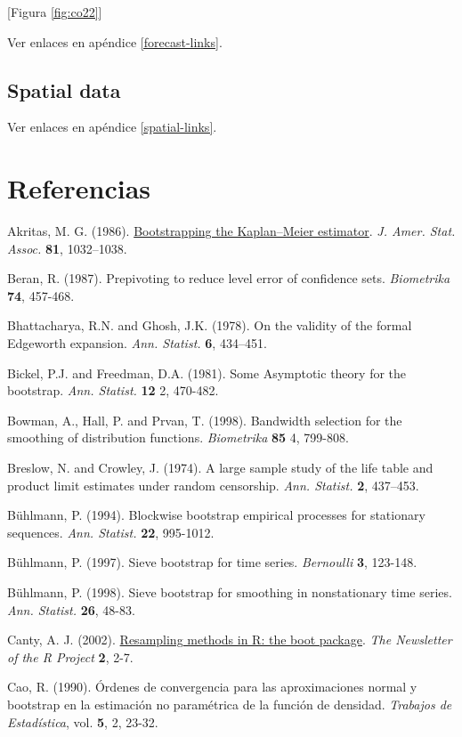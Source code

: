 \documentclass[]{book}
\theoremstyle{definition}
\theoremstyle{definition}
\theoremstyle{definition}
\theoremstyle{remark}
\begin{document}
{[}Figura \ref{fig:co22}{]}

Ver enlaces en apéndice \ref{forecast-links}.

\section{Spatial data}\label{spatial-data}

Ver enlaces en apéndice \ref{spatial-links}.

\chapter*{Referencias}\label{referencias}

Akritas, M. G. (1986).
\href{https://www.tandfonline.com/doi/abs/10.1080/01621459.1986.10478369}{Bootstrapping
the Kaplan--Meier estimator}. \emph{J. Amer. Stat. Assoc.} \textbf{81},
1032--1038.

Beran, R. (1987). Prepivoting to reduce level error of confidence sets.
\emph{Biometrika} \textbf{74}, 457-468.

Bhattacharya, R.N. and Ghosh, J.K. (1978). On the validity of the formal
Edgeworth expansion. \emph{Ann. Statist.} \textbf{6}, 434--451.

Bickel, P.J. and Freedman, D.A. (1981). Some Asymptotic theory for the
bootstrap. \emph{Ann. Statist.} \textbf{12} 2, 470-482.

Bowman, A., Hall, P. and Prvan, T. (1998). Bandwidth selection for the
smoothing of distribution functions. \emph{Biometrika} \textbf{85} 4,
799-808.

Breslow, N. and Crowley, J. (1974). A large sample study of the life
table and product limit estimates under random censorship. \emph{Ann.
Statist.} \textbf{2}, 437--453.

Bühlmann, P. (1994). Blockwise bootstrap empirical processes for
stationary sequences. \emph{Ann. Statist.} \textbf{22}, 995-1012.

Bühlmann, P. (1997). Sieve bootstrap for time series. \emph{Bernoulli}
\textbf{3}, 123-148.

Bühlmann, P. (1998). Sieve bootstrap for smoothing in nonstationary time
series. \emph{Ann. Statist.} \textbf{26}, 48-83.

Canty, A. J. (2002).
\href{http://cran.fhcrc.org/doc/Rnews/Rnews_2002-3.pdf}{Resampling
methods in R: the boot package}. \emph{The Newsletter of the R Project}
\textbf{2}, 2-7.

Cao, R. (1990). Órdenes de convergencia para las aproximaciones normal y
bootstrap en la estimación no paramétrica de la función de densidad.
\emph{Trabajos de Estadística}, vol. \textbf{5}, 2, 23-32.
\end{document}
